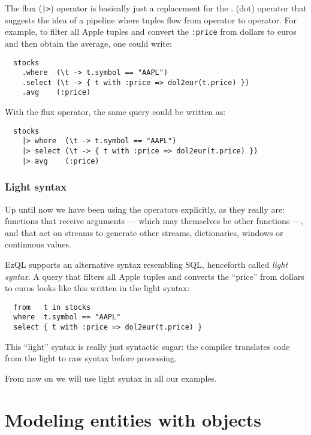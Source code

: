 \documentclass{report}
\begin{document}
The flux (\verb=|>=) operator is basically just a replacement for the
. (dot) operator that suggests the idea of a pipeline where tuples
flow from operator to operator. For example, to filter all Apple
tuples and convert the \verb=:price= from dollars to euros and then
obtain the average, one could write:

\begin{verbatim}
  stocks
    .where  (\t -> t.symbol == "AAPL")
    .select (\t -> { t with :price => dol2eur(t.price) })
    .avg    (:price)
\end{verbatim}

With the flux operator, the same query could be written as:

\begin{verbatim}
  stocks
    |> where  (\t -> t.symbol == "AAPL")
    |> select (\t -> { t with :price => dol2eur(t.price) })
    |> avg    (:price)
\end{verbatim}

\subsection{Light syntax}
\label{sec:light-syntax}

Up until now we have been using the operators explicitly, as they
really are: functions that receive arguments --- which may themselves
be other functions ---, and that act on streams to generate other
streams, dictionaries, windows or continuous values.

EzQL supports an alternative syntax resembling SQL, henceforth called
\emph{light syntax}. A query that filters all Apple tuples and
converts the ``price'' from dollars to euros looks like this written
in the light syntax:

\begin{verbatim}
  from   t in stocks
  where  t.symbol == "AAPL"
  select { t with :price => dol2eur(t.price) }
\end{verbatim}

This ``light'' syntax is really just syntactic sugar: the compiler
translates code from the light to raw syntax before processing.

From now on we will use light syntax in all our examples.

\chapter{Modeling entities with objects}
\label{chap:objects}
\end{document}
